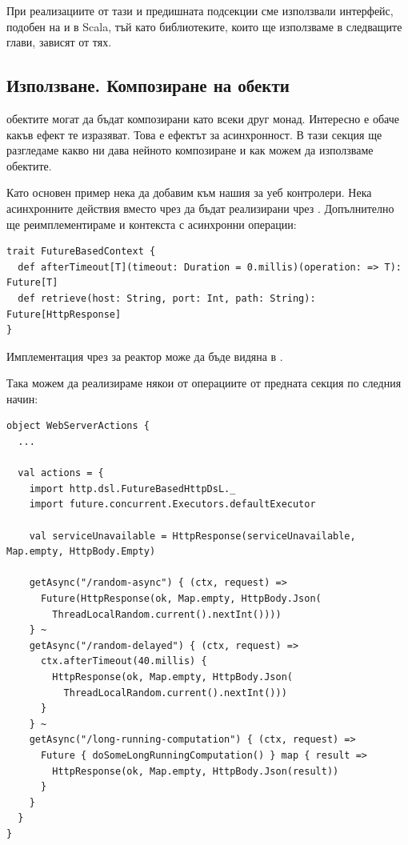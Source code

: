 При реализациите от тази и предишната подсекции сме използвали интерфейс, подобен на  и  в Scala, тъй като библиотеките, които ще използваме в следващите глави, зависят от тях.

\subsection{Използване. Композиране на  обекти}
\label{sec:composing-futures}

 обектите могат да бъдат композирани като всеки друг монад. Интересно е обаче какъв ефект те изразяват. Това е ефектът за асинхронност. В тази секция ще разгледаме какво ни дава нейното композиране и как можем да използваме  обектите.

Като основен пример нека да добавим  към нашия  за уеб контролери. Нека асинхронните действия вместо чрез  да бъдат реализирани чрез . Допълнително ще реимплементираме и контекста с асинхронни операции:

\begin{lstlisting}
trait FutureBasedContext {
  def afterTimeout[T](timeout: Duration = 0.millis)(operation: => T): Future[T]
  def retrieve(host: String, port: Int, path: String): Future[HttpResponse]
}
\end{lstlisting}

Имплементация чрез  за реактор може да бъде видяна в .

Така можем да реализираме някои от операциите от предната секция по следния начин:

\begin{lstlisting}
object WebServerActions {
  ...
  
  val actions = {
    import http.dsl.FutureBasedHttpDsL._
    import future.concurrent.Executors.defaultExecutor
    
    val serviceUnavailable = HttpResponse(serviceUnavailable, Map.empty, HttpBody.Empty)
    
    getAsync("/random-async") { (ctx, request) =>
      Future(HttpResponse(ok, Map.empty, HttpBody.Json(
        ThreadLocalRandom.current().nextInt())))
    } ~
    getAsync("/random-delayed") { (ctx, request) =>
      ctx.afterTimeout(40.millis) {
        HttpResponse(ok, Map.empty, HttpBody.Json(
          ThreadLocalRandom.current().nextInt()))
      }
    } ~
    getAsync("/long-running-computation") { (ctx, request) =>
      Future { doSomeLongRunningComputation() } map { result =>
        HttpResponse(ok, Map.empty, HttpBody.Json(result))
      }
    }
  }
}
\end{lstlisting}

